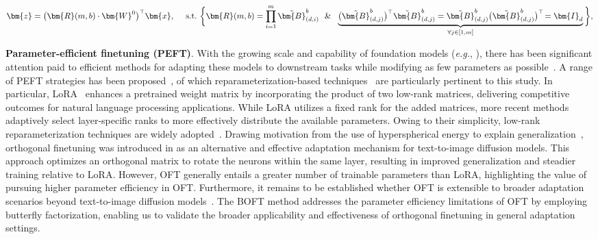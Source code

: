\begin{equation}
    \begin{aligned}\nonumber
    \bm{z}=\big(\bm{R}(m,b)\cdot\bm{W}^0\big)^\top\bm{x},~~~~\text{s.t.}~\bigg{\{}\bm{R}(m,b)=\prod_{i=1}^m \tilde{\bm{B}}^b_{(d,i)}~~\&~~\underbrace{\big(\tilde{\bm{B}}^b_{(d,j)}\big)^\top\tilde{\bm{B}}^b_{(d,j)}=\tilde{\bm{B}}^b_{(d,j)}\big(\tilde{\bm{B}}^b_{(d,j)}\big)^\top\!=\bm{I}_d}_{\forall j\in [1, m]}\bigg{\}},
    \end{aligned}
\end{equation}

\textbf{Parameter-efficient finetuning (PEFT)}. With the growing scale and capability of foundation models (\emph{e.g.}, \cite{brown2020language,radford2021learning,rombach2022high,kirillov2023segment}), there has been significant attention paid to efficient methods for adapting these models to downstream tasks while modifying as few parameters as possible~\cite{treviso2023efficient,ding2023parameter,lialin2023scaling}. A range of PEFT strategies has been proposed~\cite{houlsby2019parameter,aghajanyan2020intrinsic,hulora2022,edalati2022krona,wang2022adamix,gheini2021cross,zaken2022bitfit,guo2020parameter,sung2021training,ansell2022composable,lester2021power,li2021prefix,vu2022spot,he2021towards,mao2021unipelt,karimi2021compacter,liu2022few,sung2022lst,chen2022parameter,jia2022visual,chen2022adaptformer,zhang2022neural,jie2023fact,lian2022scaling,luo2023towards}, of which reparameterization-based techniques~\cite{aghajanyan2020intrinsic,hulora2022,edalati2022krona} are particularly pertinent to this study. In particular, LoRA~\cite{hulora2022} enhances a pretrained weight matrix by incorporating the product of two low-rank matrices, delivering competitive outcomes for natural language processing applications. While LoRA utilizes a fixed rank for the added matrices, more recent methods \cite{zhang2022adaptive,valipour2022dylora,zhang2023increlora} adaptively select layer-specific ranks to more effectively distribute the available parameters. Owing to their simplicity, low-rank reparameterization techniques are widely adopted~\cite{dettmers2023qlora,zi2023delta,chavan2023one}. Drawing motivation from the use of hyperspherical energy to explain generalization~\cite{liu2018learning,liu2021orthogonal}, orthogonal finetuning was introduced in \cite{qiu2023controlling} as an alternative and effective adaptation mechanism for text-to-image diffusion models. This approach optimizes an orthogonal matrix to rotate the neurons within the same layer, resulting in improved generalization and steadier training relative to LoRA. However, OFT generally entails a greater number of trainable parameters than LoRA, highlighting the value of pursuing higher parameter efficiency in OFT. Furthermore, it remains to be established whether OFT is extensible to broader adaptation scenarios beyond text-to-image diffusion models~\cite{qiu2023controlling}. The BOFT method addresses the parameter efficiency limitations of OFT by employing butterfly factorization, enabling us to validate the broader applicability and effectiveness of orthogonal finetuning in general adaptation settings.

